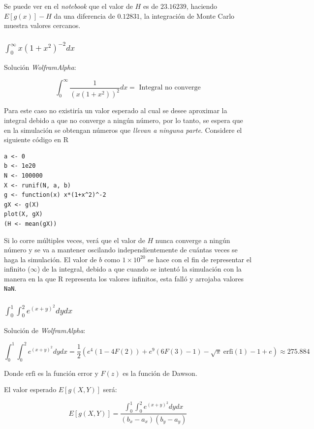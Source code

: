 \documentclass[12pt]{article}
\begin{document}
Se puede ver en el \textit{notebook} que el valor de $H$ es de $23.16239$, haciendo $E[g(x)] - H$ da una diferencia de $0.12831$, la integración de Monte Carlo muestra valores cercanos.

\subsubsection{$\int_{0}^{\infty} x(1 + x^{2})^{-2} dx$}

Solución \textit{WolframAlpha}:

\[
\int_{0}^{\infty} \frac{1}{(x (1 + x^{2}))^{2}} dx = \text{ Integral no converge}
\]

Para este caso no existiría un valor esperado al cual se desee aproximar la integral debido a que no converge a ningún número, por lo tanto, se espera que en la simulación se obtengan números que \textit{llevan a ninguna parte}. Considere el siguiente código en \textsf{R}

\begin{lstlisting}
a <- 0
b <- 1e20
N <- 100000 
X <- runif(N, a, b)
g <- function(x) x*(1+x^2)^-2
gX <- g(X)
plot(X, gX)
(H <- mean(gX))
\end{lstlisting}

Si lo corre múltiples veces, verá que el valor de $H$ nunca converge a ningún número y se va a mantener oscilando independientemente de cuántas veces se haga la simulación. El valor de $b$ como $1 \times 10^{20}$ se hace con el fin de representar el infinito ($\infty$) de la integral, debido a que cuando se intentó la simulación con la manera en la que \textsf{R} representa los valores infinitos, esta falló y arrojaba valores \texttt{NaN}.


\subsubsection{$\int_{0}^{1} \int_{0}^{2} e^{(x + y)^{2}} dydx$}

Solución de \textit{WolframAlpha}:

\[ 
\int_{0}^{1} \int_{0}^{2} e^{(x + y)^{2}} dydx = \frac{1}{2} (e^{4}(1 - 4F(2)) + e^{9} (6 F(3) - 1) - \sqrt{\pi} \ \mathrm{erfi}(1) - 1 + e  ) \approx 275.884
\]

Donde $\mathrm{erfi}$ es la función error y $F(z)$ es la función de Dawson.

El valor esperado $E[g(X, Y)]$ será:

\[
E[g(X, Y)] = \frac{\int_{0}^{1} \int_{0}^{2} e^{(x + y)^{2}} dydx}{(b_{x} - a_{x}) (b_{y} - a_{y})}
\]
\end{document}
